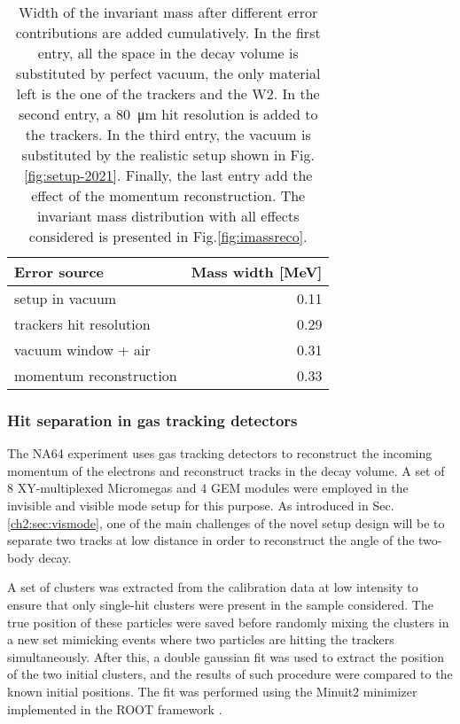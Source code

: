 \begin{center}
  \begin{table}[bth!]
    \centering
    \begin{tabular}{|l|r|}
      \hline
      Error source & Mass width [MeV]\\
      \hline
      setup in vacuum & 0.11\\
      trackers hit resolution & 0.29\\
      vacuum window + air & 0.31\\
      momentum reconstruction & 0.33\\
      \hline
    \end{tabular}
    \caption[Error budget for the invariant mass in 2021 setup]{Width of the invariant mass after different error contributions are added cumulatively. In the first entry, all the space in the decay volume is substituted by perfect vacuum, the only material left is the one of the trackers and the W2. In the second entry, a \SI{80}{\micro\meter} hit resolution is added to the trackers. In the third entry, the vacuum is substituted by the realistic setup shown in Fig.\ref{fig:setup-2021}. Finally, the last entry add the effect of the momentum reconstruction. The invariant mass distribution with all effects considered is presented in Fig.\ref{fig:imassreco}.}
    \label{tab:imass-width}    
  \end{table}
\end{center}

\subsubsection{Hit separation in gas tracking detectors}
\label{ch5:sec:separ-hit-micr}

The NA64 experiment uses gas tracking detectors to reconstruct the incoming momentum of the electrons and reconstruct tracks in the decay volume. A set of 8 XY-multiplexed Micromegas and 4 GEM modules were employed in the invisible and visible mode setup for this purpose. As introduced in Sec.\ref{ch2:sec:vismode}, one of the main challenges of the novel setup design will be to separate two tracks at low distance in order to reconstruct the angle of the two-body decay.

A set of clusters was extracted from the calibration data at low intensity to ensure that only single-hit clusters were present in the sample considered. The true position of these particles were saved before randomly mixing the clusters in a new set mimicking events where two particles are hitting the trackers simultaneously. After this, a double gaussian fit was used to extract the position of the two initial clusters, and the results of such procedure were compared to the known initial positions. The fit was performed using the Minuit2 minimizer implemented in the ROOT framework \cite{root}.

